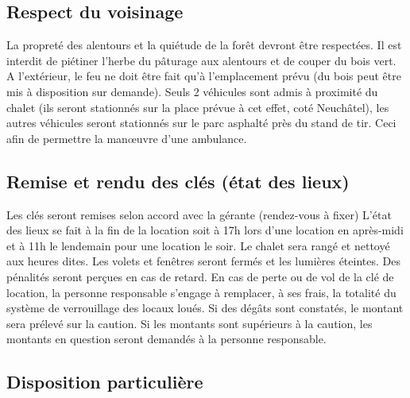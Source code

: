 \documentclass[a4paper,12pt]{extarticle}
\begin{document}
\subsection{Respect du voisinage}
La propreté des alentours et la quiétude de la forêt devront être respectées.
Il est interdit de piétiner l'herbe du pâturage aux alentours et de couper du bois vert.
A l'extérieur, le feu ne doit être fait qu'à l'emplacement prévu (du bois peut être mis à disposition sur demande).
Seuls 2 véhicules sont admis à proximité du chalet (ils seront stationnés sur la place prévue à cet effet, coté Neuchâtel), les autres véhicules seront stationnés sur le parc asphalté près du stand de tir.
Ceci afin de permettre la manœuvre d'une ambulance.

\subsection{Remise et rendu des clés (état des lieux)}
Les clés seront remises selon accord avec la gérante (rendez-vous à fixer)
{\color{red} L'état des lieux se fait à la fin de la location} soit à 17h lors d'une location en après-midi et à 11h le lendemain pour une location le soir.
Le chalet sera rangé et nettoyé aux heures dites. Les volets et fenêtres seront fermés et les lumières éteintes.
{\color{red} Des pénalités seront perçues en cas de retard.
En cas de perte ou de vol de la clé de location, la personne responsable s'engage à remplacer, à ses frais, la totalité du système de verrouillage des locaux loués.
Si des dégâts sont constatés, le montant sera prélevé sur la caution. Si les montants sont supérieurs à la caution, les montants en question seront demandés à la personne responsable.}


\subsection{Disposition particulière}
\end{document}
